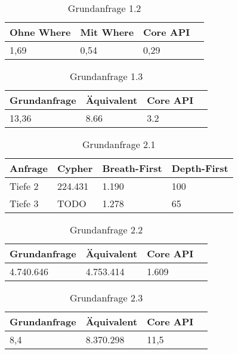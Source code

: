\begin{table}[!htb]
	\begin{center}
		\begin{tabular}{ |p{3cm}|p{3cm}|p{3cm}|p{3cm}|  }
			\hline
			Ohne Where& Mit Where  &Core API\\
			\hline
			1,69   &  0,54  &0,29 \\
			\hline
		\end{tabular}
		\caption{Grundanfrage 1.2}
	\end{center}
\end{table}

\begin{table}[!htb]
	\begin{center}
		\begin{tabular}{ |p{3cm}|p{3cm}|p{3cm}|p{3cm}|  }
			\hline
			Grundanfrage & Äquivalent&Core API\\
			\hline
			 13,36    & 8.66 &  3.2\\
			\hline
		\end{tabular}
		\caption{Grundanfrage 1.3}
	\end{center}
\end{table}

\begin{table}[!htb]
	\begin{center}
		\begin{tabular}{ |p{3cm}||p{3cm}|p{3cm}|p{3cm}|  }
			\hline
			Anfrage& Cypher & Breath-First&Depth-First\\
			\hline
			Tiefe 2   & 224.431    & 1.190&  100\\
			Tiefe 3&    TODO  & 1.278   & 65\\
			\hline
		\end{tabular}
		\caption{Grundanfrage 2.1}
	\end{center}
\end{table}

\begin{table}[!htb]
	\begin{center}
		\begin{tabular}{ |p{3cm}|p{3cm}|p{3cm}|p{3cm}|  }
			\hline
			Grundanfrage & Äquivalent&Core API\\
			\hline
			4.740.646    & 4.753.414 &  1.609\\
			\hline
		\end{tabular}
		\caption{Grundanfrage 2.2}
	\end{center}
\end{table}

\begin{table}[!htb]
	\begin{center}
		\begin{tabular}{ |p{3cm}|p{3cm}|p{3cm}|p{3cm}|  }
			\hline
			Grundanfrage & Äquivalent&Core API\\
			\hline
			8,4    & 8.370.298 &  11,5\\
			\hline
		\end{tabular}
		\caption{Grundanfrage 2.3}
	\end{center}
\end{table}